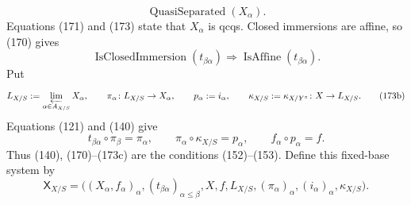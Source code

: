 \begin{definition}
\[    \operatorname{QuasiSeparated}(X_\alpha).                       \tag{173}
  \]
  Equations (171) and (173) state that $X_\alpha$ is qcqs.
  Closed immersions are affine, so (170) gives
  \[
    \operatorname{IsClosedImmersion}(t_{\beta\alpha})
      \Longrightarrow\operatorname{IsAffine}(t_{\beta\alpha}).     \tag{173a}
  \]
  Put
  \[
    L_{X/S}:=\varprojlim_{\alpha\in A_{X/S}}X_\alpha,\qquad
    \pi_\alpha\colon L_{X/S}\to X_\alpha,\qquad
    p_\alpha:=i_\alpha,\qquad
    \kappa_{X/S}:=\kappa_{X/Y^\circ}\colon X\to L_{X/S}.            \tag{173b}
  \]
  Equations (121) and (140) give
  \[
    t_{\beta\alpha}\circ\pi_\beta=\pi_\alpha,\qquad
    \pi_\alpha\circ\kappa_{X/S}=p_\alpha,\qquad
    f_\alpha\circ p_\alpha=f.                                      \tag{173c}
  \]
  Thus (140), (170)--(173c) are the conditions (152)--(153).  Define this
  fixed-base system by
  \[
    \mathsf X_{X/S}
      =\bigl((X_\alpha,f_\alpha)_\alpha,
        (t_{\beta\alpha})_{\alpha\leq\beta},
        X,f,L_{X/S},(\pi_\alpha)_\alpha,
        (i_\alpha)_\alpha,\kappa_{X/S}\bigr).                      \tag{174}
  \]


\end{definition}

